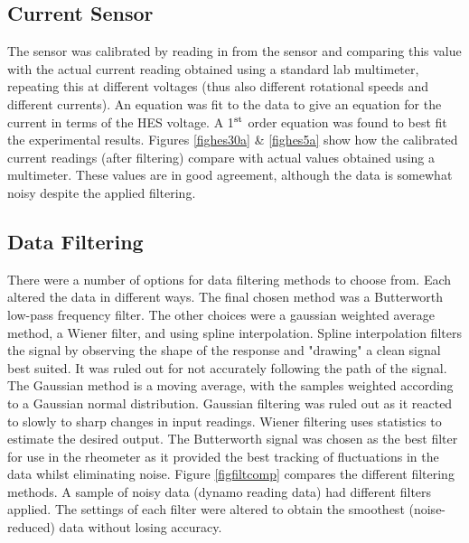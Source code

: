 \documentclass[twoside,a4]{report}
\def\br{\newline \newline \noindent}
\begin{document}
	\subsection*{Current Sensor}
	The sensor was calibrated by reading in from the sensor and comparing this value with the actual current reading obtained using a standard lab multimeter, repeating this at different voltages (thus also different rotational speeds and different currents). An equation was fit to the data to give an equation for the current in terms of the HES voltage. A 1$\rm ^{st}$ order equation was found to best fit the experimental results.\br
	Figures \ref{fighes30a} \& \ref{fighes5a} show how the calibrated current readings (after filtering) compare with actual values obtained using a multimeter. These values are in good agreement, although the data is somewhat noisy despite the applied filtering.
	
	\subsection*{Data Filtering}
	There were a number of options for data filtering methods to choose from. Each altered the data in different ways. The final chosen method was a Butterworth low-pass frequency filter. The other choices were a gaussian weighted average method, a Wiener filter, and using spline interpolation. Spline interpolation filters the signal by observing the shape of the response and "drawing" a clean signal best suited. It was ruled out for not accurately following the path of the signal. The Gaussian method is a moving average, with the samples weighted according to a Gaussian normal distribution. Gaussian filtering was ruled out as it reacted to slowly to sharp changes in input readings. Wiener filtering uses statistics to estimate the desired output. The Butterworth signal was chosen as the best filter for use in the rheometer as it provided the best tracking of fluctuations in the data whilst eliminating noise.
	\br
	Figure \ref{figfiltcomp} compares the different filtering methods. A sample of noisy data (dynamo reading data) had different filters applied. The settings of each filter were altered to obtain the smoothest (noise-reduced) data without losing accuracy.
	\newline
	
\end{document}
